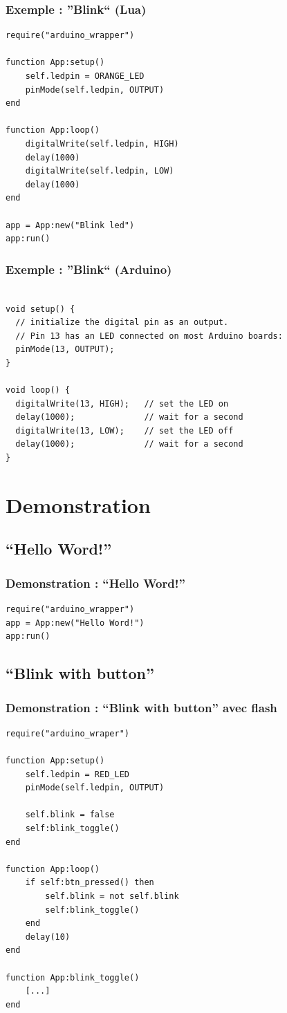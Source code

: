\documentclass{beamer}
\begin{document}
\begin{frame}[containsverbatim]
\frametitle{Exemple : ''Blink`` (Lua)}
\tiny{\begin{lstlisting}
require("arduino_wrapper")

function App:setup()
    self.ledpin = ORANGE_LED
    pinMode(self.ledpin, OUTPUT)
end

function App:loop()
    digitalWrite(self.ledpin, HIGH)
    delay(1000)
    digitalWrite(self.ledpin, LOW)
    delay(1000)
end

app = App:new("Blink led")
app:run()
\end{lstlisting}}
\end{frame}

\begin{frame}[containsverbatim]
\frametitle{Exemple : ''Blink`` (Arduino)}
\tiny{\begin{lstlisting}

void setup() {
  // initialize the digital pin as an output.
  // Pin 13 has an LED connected on most Arduino boards:
  pinMode(13, OUTPUT);
}

void loop() {
  digitalWrite(13, HIGH);   // set the LED on
  delay(1000);              // wait for a second
  digitalWrite(13, LOW);    // set the LED off
  delay(1000);              // wait for a second
}
\end{lstlisting}}
\end{frame}


\section{Demonstration}
\subsection{``Hello Word!''}
\begin{frame}[containsverbatim]
\frametitle{Demonstration : ``Hello Word!''}
\begin{lstlisting}
require("arduino_wrapper")
app = App:new("Hello Word!")
app:run()
\end{lstlisting}
\end{frame}

\subsection{``Blink with button''}
\begin{frame}[containsverbatim]
\frametitle{Demonstration : ``Blink with button'' avec flash}
\tiny{\begin{lstlisting}
require("arduino_wraper")

function App:setup()
    self.ledpin = RED_LED
    pinMode(self.ledpin, OUTPUT)

    self.blink = false
    self:blink_toggle()
end

function App:loop()
    if self:btn_pressed() then
        self.blink = not self.blink
        self:blink_toggle()
    end
    delay(10)
end

function App:blink_toggle()
    [...]
end
\end{lstlisting}}
\end{frame}
\end{document}
